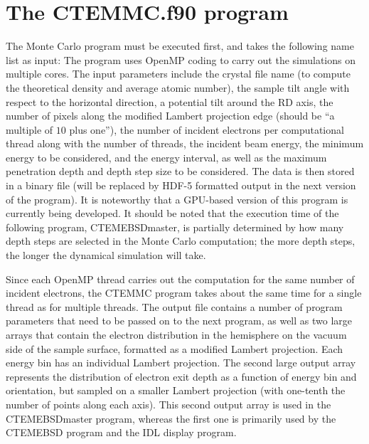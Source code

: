 \documentclass[DIV=calc, paper=letter, fontsize=11pt]{scrartcl}	 %
\begin{document}
\section{The \protect\textsf{CTEMMC.f90} program\label{sec:f90MC}}
The Monte Carlo program must be executed first, and takes the following name list as input:
The program uses OpenMP coding to carry out the simulations on multiple cores.  The input parameters
include the crystal file name (to compute the theoretical density and average atomic number), the sample
tilt angle with respect to the horizontal direction, a potential tilt around the \textsf{RD} axis, the number of pixels
along the modified Lambert projection edge (should be ``a multiple of $10$ plus one''), the number of incident electrons per computational thread along
with the number of threads, the incident beam energy, the minimum energy to be considered, and the energy interval,
as well as the maximum penetration depth and depth step size to be considered.  The data is then stored in a 
binary file (will be replaced by HDF-5 formatted output in the next version of the program).  It is noteworthy that 
a GPU-based version of this program is currently being developed.   It should be noted that the execution time of the 
following program, \textsf{CTEMEBSDmaster}, is partially determined by how many depth steps are selected in the
Monte Carlo computation; the more depth steps, the longer the dynamical simulation will take.

Since each OpenMP thread carries out the computation for the same number of incident electrons, the \textsf{CTEMMC} program takes 
about the  same time for a single thread as for multiple threads.  The output file contains a number of program parameters
that need to be passed on to the next program, as well as two large arrays that contain the electron distribution in the hemisphere on
the vacuum side of the sample surface, formatted as a modified Lambert projection.  Each energy bin has an individual Lambert 
projection.  The second large output array represents the distribution of electron exit depth as a function of energy bin and
orientation, but sampled on a smaller Lambert projection (with one-tenth the number of points along each axis).  This second output
array is used in the \textsf{CTEMEBSDmaster} program, whereas the first one is primarily used by the \textsf{CTEMEBSD} program
and the IDL display program.
\end{document}

